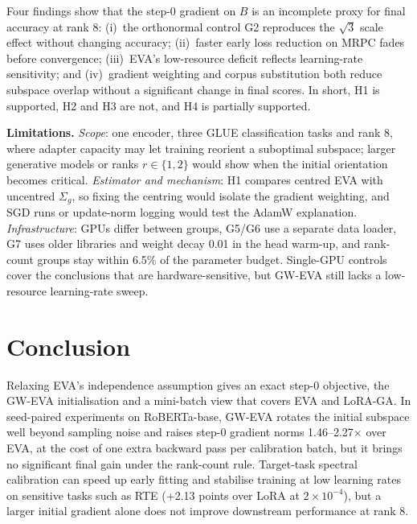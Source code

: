 \documentclass[letterpaper]{article} %
\newcommand{\Sg}{\Sigma_g}
\begin{document}
Four findings show that the step-0 gradient on $B$ is an incomplete proxy for final accuracy at rank 8: (i)~the orthonormal control G2 reproduces the $\sqrt{3}$ scale effect without changing accuracy; (ii)~faster early loss reduction on MRPC fades before convergence; (iii)~EVA's low-resource deficit reflects learning-rate sensitivity; and (iv)~gradient weighting and corpus substitution both reduce subspace overlap without a significant change in final scores. In short, H1 is supported, H2 and H3 are not, and H4 is partially supported.

\textbf{Limitations.} \emph{Scope}: one encoder, three GLUE classification tasks and rank 8, where adapter capacity may let training reorient a suboptimal subspace; larger generative models or ranks $r\in\{1,2\}$ would show when the initial orientation becomes critical. \emph{Estimator and mechanism}: H1 compares centred EVA with uncentred $\Sg$, so fixing the centring would isolate the gradient weighting, and SGD runs or update-norm logging would test the AdamW explanation. \emph{Infrastructure}: GPUs differ between groups, G5/G6 use a separate data loader, G7 uses older libraries and weight decay 0.01 in the head warm-up, and rank-count groups stay within 6.5\% of the parameter budget. Single-GPU controls cover the conclusions that are hardware-sensitive, but GW-EVA still lacks a low-resource learning-rate sweep.

\section{Conclusion}
Relaxing EVA's independence assumption gives an exact step-0 objective, the GW-EVA initialisation and a mini-batch view that covers EVA and LoRA-GA. In seed-paired experiments on RoBERTa-base, GW-EVA rotates the initial subspace well beyond sampling noise and raises step-0 gradient norms 1.46--2.27$\times$ over EVA, at the cost of one extra backward pass per calibration batch, but it brings no significant final gain under the rank-count rule. Target-task spectral calibration can speed up early fitting and stabilise training at low learning rates on sensitive tasks such as RTE (+2.13 points over LoRA at $2\times10^{-4}$), but a larger initial gradient alone does not improve downstream performance at rank 8.
\end{document}
